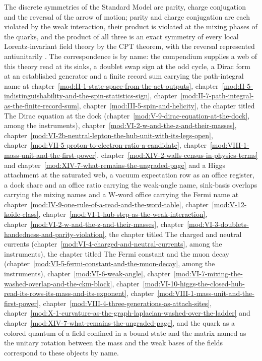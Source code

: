 \begin{chbridge}
The discrete symmetries of the Standard Model are parity, charge conjugation and the reversal of the arrow of motion; parity and charge conjugation are each violated by the weak interaction, their product is violated at the mixing phases of the quarks, and the product of all three is an exact symmetry of every local Lorentz-invariant field theory by the CPT theorem, with the reversal represented antiunitarily \cite{Lee1956,Wu1957,Luders1954}. The correspondence is by name: the compendium supplies a web of this theory read at its sinks, a doublet swap sign at the odd cycle, a Dirac form at an established generator and a finite record sum carrying the path-integral name at chapter~\ref{mod:II-1-state-space-from-the-act-outputs}, chapter~\ref{mod:II-5-indistinguishability-and-the-spin-statistics-sign}, chapter~\ref{mod:II-7-path-integral-as-the-finite-record-sum}, chapter~\ref{mod:III-5-spin-and-helicity}, the chapter titled The Dirac equation at the dock (chapter~\ref{mod:V-9-dirac-equation-at-the-dock}, among the instruments), chapter~\ref{mod:VI-2-w-and-the-z-and-their-masses}, chapter~\ref{mod:VI-2b-neutral-lepton-the-hub-unit-with-its-legs-open}, chapter~\ref{mod:VII-5-proton-to-electron-ratio-a-candidate}, chapter~\ref{mod:VIII-1-mass-unit-and-the-first-power}, chapter~\ref{mod:XIV-2-walls-census-in-physics-terms} and chapter~\ref{mod:XIV-7-what-remains-the-ungraded-page} and a Higgs attachment at the saturated web, a vacuum expectation row as an office register, a dock share and an office ratio carrying the weak-angle name, sink-basis overlaps carrying the mixing names and a W-word office carrying the Fermi name at chapter~\ref{mod:IV-9-one-rule-of-a-read-and-the-word-table}, chapter~\ref{mod:V-12-koide-class}, chapter~\ref{mod:VI-1-hub-step-as-the-weak-interaction}, chapter~\ref{mod:VI-2-w-and-the-z-and-their-masses}, chapter~\ref{mod:VI-3-doublets-handedness-and-parity-violation}, the chapter titled The charged and neutral currents (chapter~\ref{mod:VI-4-charged-and-neutral-currents}, among the instruments), the chapter titled The Fermi constant and the muon decay (chapter~\ref{mod:VI-5-fermi-constant-and-the-muon-decay}, among the instruments), chapter~\ref{mod:VI-6-weak-angle}, chapter~\ref{mod:VI-7-mixing-the-washed-overlap-and-the-ckm-block}, chapter~\ref{mod:VI-10-higgs-the-closed-hub-read-its-rows-its-mass-and-its-exponent}, chapter~\ref{mod:VIII-1-mass-unit-and-the-first-power}, chapter~\ref{mod:VIII-4-three-generations-as-attach-sites}, chapter~\ref{mod:X-1-curvature-as-the-graph-laplacian-washed-over-the-ladder} and chapter~\ref{mod:XIV-7-what-remains-the-ungraded-page}, and the quark as a colored quantum of a field confined in a bound state and the matrix named as the unitary rotation between the mass and the weak bases of the fields correspond to these objects by name.
\end{chbridge}
